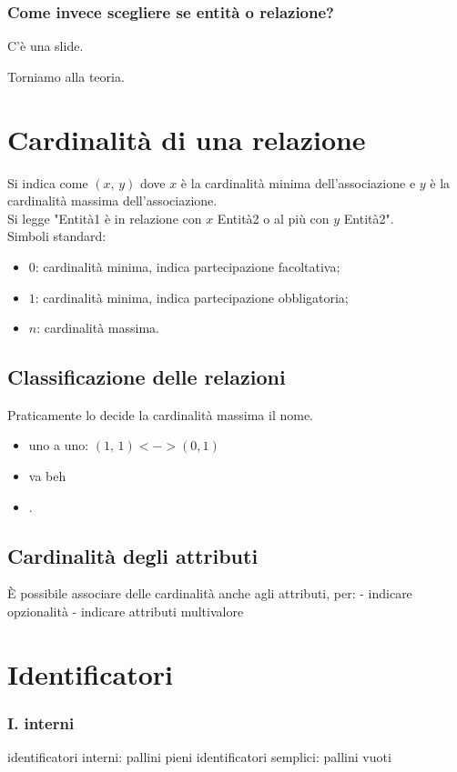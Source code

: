 \subsubsection{Come invece scegliere se entità o relazione?}
C'è una slide.

Torniamo alla teoria.
\section{Cardinalità di una relazione}
Si indica come $(x,\, y)$ dove $x$ è la cardinalità minima dell'associazione e $y$ è la cardinalità massima dell'associazione.
\\Si legge "Entità1 è in relazione con $x$ Entità2 o al più con $y$ Entità2".
\\Simboli standard:
\begin{itemize}
    \item $0$: cardinalità minima, indica partecipazione facoltativa;
    \item $1$: cardinalità minima, indica partecipazione obbligatoria;
    \item $n$: cardinalità massima.
\end{itemize}

\subsection{Classificazione delle relazioni}
Praticamente lo decide la cardinalità massima il nome.
\begin{itemize}
    \item uno a uno: $(1,\, 1) <-> (0,1)$
    \item va beh
    \item .
\end{itemize}

\subsection{Cardinalità degli attributi}
\`E possibile associare delle cardinalità anche agli attributi, per:
- indicare opzionalità
- indicare attributi multivalore

\section{Identificatori}
\subsubsection{I. interni}
identificatori interni: pallini pieni
identificatori semplici: pallini vuoti

